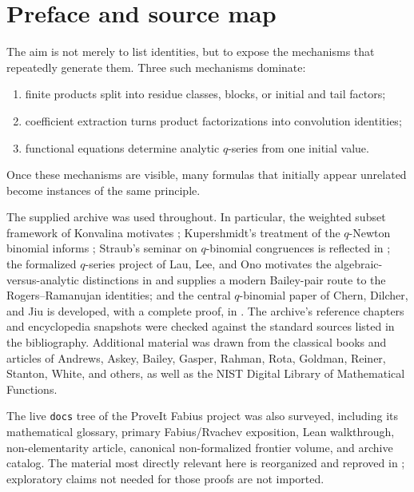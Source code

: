 \documentclass[11pt,oneside,openany]{book}
\theoremstyle{definition}
\theoremstyle{remark}
\begin{document}
\chapter*{Preface and source map}
The aim is not merely to list identities, but to expose the mechanisms that repeatedly generate them.  Three such mechanisms dominate:
\begin{enumerate}
\item finite products split into residue classes, blocks, or initial and tail factors;
\item coefficient extraction turns product factorizations into convolution identities;
\item functional equations determine analytic $q$-series from one initial value.
\end{enumerate}
Once these mechanisms are visible, many formulas that initially appear unrelated become instances of the same principle.

The supplied archive was used throughout.  In particular, the weighted subset framework of Konvalina motivates ; Kupershmidt's treatment of the $q$-Newton binomial informs ; Straub's seminar on $q$-binomial congruences is reflected in ; the formalized $q$-series project of Lau, Lee, and Ono motivates the algebraic-versus-analytic distinctions in  and supplies a modern Bailey-pair route to the Rogers--Ramanujan identities; and the central $q$-binomial paper of Chern, Dilcher, and Jiu is developed, with a complete proof, in .  The archive's reference chapters and encyclopedia snapshots were checked against the standard sources listed in the bibliography.  Additional material was drawn from the classical books and articles of Andrews, Askey, Bailey, Gasper, Rahman, Rota, Goldman, Reiner, Stanton, White, and others, as well as the NIST Digital Library of Mathematical Functions.

The live \texttt{docs} tree of the ProveIt Fabius project was also surveyed, including its mathematical glossary, primary Fabius/Rvachev exposition, Lean walkthrough, non-elementarity article, canonical non-formalized frontier volume, and archive catalog.  The material most directly relevant here is reorganized and reproved in ; exploratory claims not needed for those proofs are not imported.
\end{document}
